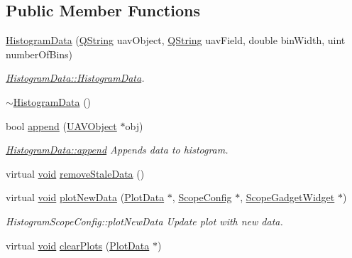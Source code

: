 \subsection*{\-Public \-Member \-Functions}
\begin{DoxyCompactItemize}
\item 
\hyperlink{group___scope_plugin_ga72e50dd5614c61d39ec10aa120c47d3b}{\-Histogram\-Data} (\hyperlink{group___u_a_v_objects_plugin_gab9d252f49c333c94a72f97ce3105a32d}{\-Q\-String} uav\-Object, \hyperlink{group___u_a_v_objects_plugin_gab9d252f49c333c94a72f97ce3105a32d}{\-Q\-String} uav\-Field, double bin\-Width, uint number\-Of\-Bins)
\begin{DoxyCompactList}\small\item\em \hyperlink{group___scope_plugin_ga72e50dd5614c61d39ec10aa120c47d3b}{\-Histogram\-Data\-::\-Histogram\-Data}. \end{DoxyCompactList}\item 
\hyperlink{group___scope_plugin_ga4469655db4ea251dc664d6537ac56c5a}{$\sim$\-Histogram\-Data} ()
\item 
bool \hyperlink{group___scope_plugin_ga0d810ba48c487ee265cdc1386b23bece}{append} (\hyperlink{class_u_a_v_object}{\-U\-A\-V\-Object} $\ast$obj)
\begin{DoxyCompactList}\small\item\em \hyperlink{group___scope_plugin_ga0d810ba48c487ee265cdc1386b23bece}{\-Histogram\-Data\-::append} \-Appends data to histogram. \end{DoxyCompactList}\item 
virtual \hyperlink{group___u_a_v_objects_plugin_ga444cf2ff3f0ecbe028adce838d373f5c}{void} \hyperlink{group___scope_plugin_ga347aa15de12fde18bb0b88245ef0ff57}{remove\-Stale\-Data} ()
\item 
virtual \hyperlink{group___u_a_v_objects_plugin_ga444cf2ff3f0ecbe028adce838d373f5c}{void} \hyperlink{group___scope_plugin_gac17c425a9e59f0b1187d76a8cc13e6ad}{plot\-New\-Data} (\hyperlink{class_plot_data}{\-Plot\-Data} $\ast$, \hyperlink{class_scope_config}{\-Scope\-Config} $\ast$, \hyperlink{class_scope_gadget_widget}{\-Scope\-Gadget\-Widget} $\ast$)
\begin{DoxyCompactList}\small\item\em \-Histogram\-Scope\-Config\-::plot\-New\-Data \-Update plot with new data. \end{DoxyCompactList}\item 
virtual \hyperlink{group___u_a_v_objects_plugin_ga444cf2ff3f0ecbe028adce838d373f5c}{void} \hyperlink{group___scope_plugin_gaba86940fa8881f8a36b2bafacd9d59f6}{clear\-Plots} (\hyperlink{class_plot_data}{\-Plot\-Data} $\ast$)

\end{DoxyCompactItemize}
